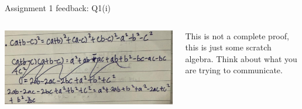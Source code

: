 \documentclass[aspectratio=169]{beamer}
\begin{document}
\begin{frame}{Assignment 1 feedback: Q1(i)}
\begin{columns}
\begin{column}{0.5\textwidth}
    \begin{center}
  \includegraphics[width=\textwidth]{Screenshot_20250331_102924}
     \end{center}
\end{column}
\begin{column}{0.5\textwidth}
  This is not a complete proof, this is just some scratch algebra. Think about what you are trying to communicate.
\end{column}
\end{columns}
\end{frame}
\end{document}
